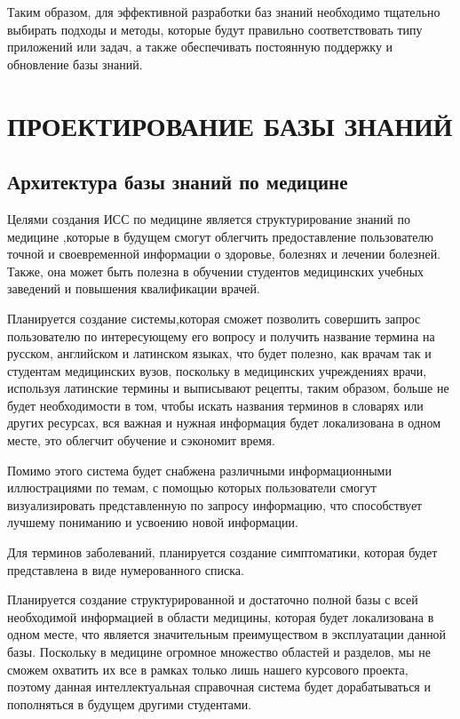 Таким образом, для эффективной разработки баз знаний необходимо тщательно выбирать подходы и методы, которые будут правильно соответствовать типу приложений или задач, а также обеспечивать постоянную поддержку и обновление базы знаний.
\section{ПРОЕКТИРОВАНИЕ БАЗЫ ЗНАНИЙ}
\subsection{Архитектура базы знаний по медицине}
Целями создания ИСС по медицине является структурирование знаний по медицине ,которые в будущем смогут облегчить предоставление пользователю точной и своевременной информации о здоровье, болезнях и лечении болезней. Также, она  может быть полезна в обучении студентов медицинских учебных заведений и повышения квалификации врачей.

Планируется создание системы,которая сможет позволить совершить запрос пользователю по интересующему его вопросу и получить название термина на русском, английском и латинском языках, что будет полезно, как врачам так и студентам медицинских вузов, поскольку в медицинских учреждениях врачи, используя латинские термины и выписывают рецепты, таким образом, больше не будет необходимости в том, чтобы искать названия терминов в словарях или других ресурсах, вся важная и нужная информация будет локализована в одном месте, это облегчит обучение и сэкономит время.

Помимо этого система будет снабжена различными информационными иллюстрациями по темам, с помощью которых пользователи смогут визуализировать представленную по запросу информацию, что способствует лучшему пониманию и усвоению новой информации. 

Для терминов заболеваний, планируется создание симптоматики, которая будет представлена в виде нумерованного списка. 

Планируется создание структурированной и достаточно полной базы с всей необходимой информацией в области медицины, которая будет локализована в одном месте, что является значительным преимуществом в эксплуатации данной базы.
Поскольку в медицине огромное множество областей и разделов, мы не сможем охватить их все в рамках только лишь нашего курсового проекта, поэтому данная интеллектуальная справочная система будет дорабатываться и пополняться в будущем другими студентами. 
